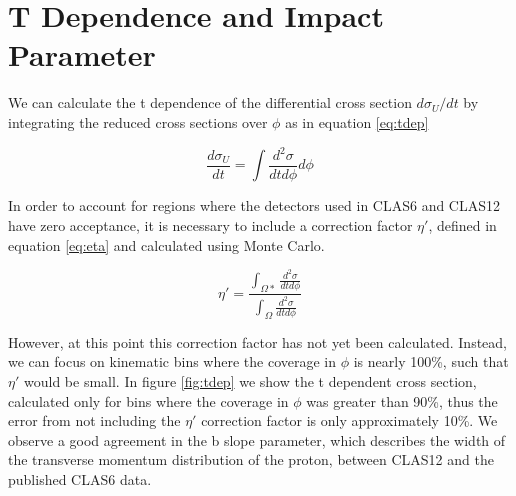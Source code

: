 \clearpage
\section{T Dependence and Impact Parameter}
    
    We can calculate the t dependence of the differential cross section $d\sigma_U/dt$ by integrating the reduced cross sections over $\phi$ as in equation \ref{eq:tdep}
    
     \begin{equation}\label{eq:tdep}
        \frac{d\sigma_U}{dt} = \int \frac{d^2\sigma}{dtd\phi} d\phi
    \end{equation}
    
    In order to account for regions where the detectors used in CLAS6 and CLAS12 have zero acceptance, it is necessary to include a correction factor $\eta'$, defined in equation \ref{eq:eta} and calculated using Monte Carlo. 
    
     \begin{equation}\label{eq:eta}
        \eta' = \frac{\int_{\Omega*} \frac{d^2\sigma}{dtd\phi} }{\int_{\Omega} \frac{d^2\sigma}{dtd\phi}}
    \end{equation}
    
    However, at this point this correction factor has not yet been calculated. Instead, we can focus on kinematic bins where the coverage in $\phi$ is nearly 100\%, such that $\eta'$ would be small. In figure \ref{fig:tdep} we show the t dependent cross section, calculated only for bins where the coverage in $\phi$ was greater than 90\%, thus the error from not including the $\eta'$ correction factor is only approximately 10\%. We observe a good agreement in the b slope parameter, which describes the width of the transverse momentum distribution of the proton, between CLAS12 and the published CLAS6 data.
    
